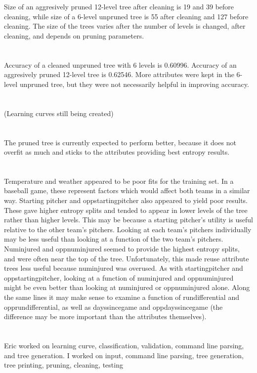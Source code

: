 \documentclass[11pt]{article}
\begin{document}
\section{}

Size of an aggresively pruned 12-level tree after cleaning is 19 and 39 before cleaning, while size of a 6-level unpruned tree is 55 after cleaning and 127 before cleaning. The size of the trees varies after the number of levels is changed, after cleaning, and depends on pruning parameters.

\section{}

Accuracy of a cleaned unpruned tree with 6 levels is 0.60996. Accuracy of an aggresively pruned 12-level tree is 0.62546. More attributes were kept in the 6-level unpruned tree, but they were not necessarily helpful in improving accuracy.

\section{}

(Learning curves still being created)

\section{}

The pruned tree is currently expected to perform better, because it does not overfit as much and sticks to the attributes providing best entropy results.

\section{}

Temperature and weather appeared to be poor fits for the training set. In a baseball game, these represent factors which would affect both teams in a similar way. Starting pitcher and oppstartingpitcher also appeared to yield poor results. These gave higher entropy splits and tended to appear in lower levels of the tree rather than higher levels. This may be because a starting pitcher's utility is useful relative to the other team's pitchers. Looking at each team's pitchers individually may be less useful than looking at a function of the two team's pitchers. Numinjured and oppnuminjured seemed to provide the highest entropy splits, and were often near the top of the tree. Unfortunately, this made reuse attribute trees less useful because numinjured was overused. As with startingpitcher and oppstartingpitcher, looking at a function of numinjured and oppnuminjured might be even better than looking at numinjured or oppnuminjured alone. Along the same lines it may make sense to examine a function of rundifferential and opprundifferential, as well as dayssincegame and oppdayssincegame (the difference may be more important than the attributes themselves).

\section{}

Eric worked on learning curve, classification, validation, command line parsing, and tree generation. I worked on input, command line parsing, tree generation, tree printing, pruning, cleaning, testing
\end{document}
